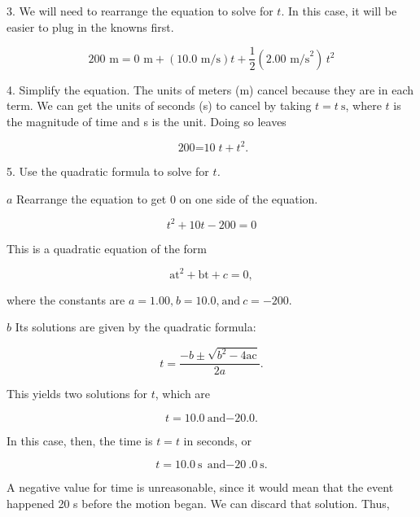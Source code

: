 \documentclass[
]{book}
\begin{document}
3. We will need to rearrange the equation to solve for \(t{}\). In this
case, it will be easier to plug in the knowns first.

\leavevmode{}%
\[{{\text{200\ m} = {\text{0\ m} + \left( {\text{10}\text{.}\text{0\ m/s}} \right)}}{t + \frac{1}{2}}\left( {2\text{.}\text{00\ m/s}^{2}} \right)\, t^{2}}{}\]

4. Simplify the equation. The units of meters (m) cancel because they
are in each term. We can get the units of seconds (s) to cancel by
taking \({{t = t}\ \text{s}}{}\), where \(t{}\) is the magnitude of time and
s is the unit. Doing so leaves

\leavevmode{}%
\[{{{\text{200} = \text{10}}{t + t^{2}}}\text{.}}{}\]

5. Use the quadratic formula to solve for \(t{}\)\emph{.}

\(a\) Rearrange the equation to get 0 on one side of the equation.

\leavevmode{}%
\[{{t^{2} + \text{10}}{{t - \text{200}} = 0}}{}\]

This is a quadratic equation of the form

\leavevmode{}%
\[{{{{\text{at}^{2} + \text{bt}} + c} = 0},}{}\]

where the constants are
\({{a = 1}\text{.}\text{00,}\ {b = \text{10}}\text{.}\text{0,}\ \text{and}\ {c = {- \text{200}}}}{}\).

\(b\) Its solutions are given by the quadratic formula:

\leavevmode{}%
\[{t = \frac{{- b} \pm \sqrt{{b^{2} - 4}\text{ac}}}{2a}}\text{.}\]

This yields two solutions for \(t{}\), which are

\leavevmode{}%
\[{{{t = \text{10}}\text{.}0\ \text{and}{- \text{20}}\text{.}0}.}{}\]

In this case, then, the time is
\({t = t}{}\)\emph{}
in\emph{} seconds, or

\leavevmode{}%
\[{{{t = \text{10}}\text{.}0\ \text{s}\ {\text{and} - \text{20}}\text{.}0\ \text{s}}.}{}\]

A negative value for time is unreasonable, since it would mean that the
event happened 20 s before the motion began. We can discard that
solution. Thus,
\end{document}
